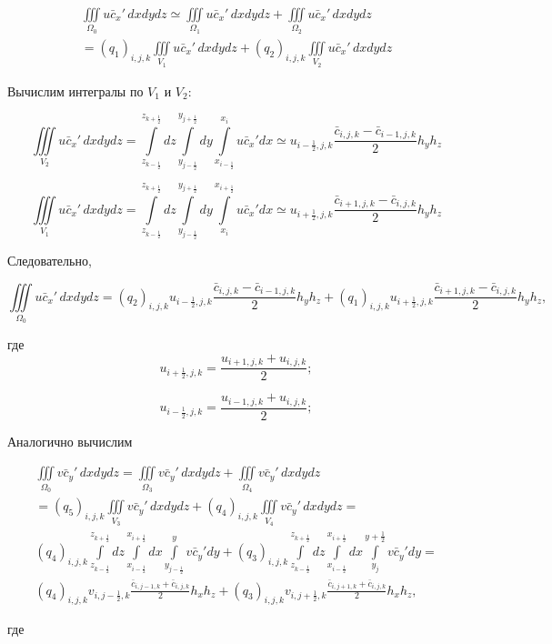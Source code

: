 \documentclass[12pt]{article}
\begin{document}
\begin{multline*}
\iiint\limits_{\Omega_0} u\bar{c}_x'\,dxdydz \simeq \iiint\limits_{\Omega_1} u\bar{c}_x'\,dxdydz + \iiint\limits_{\Omega_2} u\bar{c}_x'\,dxdydz \\  
= (q_1)_{i,j,k}\iiint\limits_{V_1} u\bar{c}_x'\,dxdydz + (q_2)_{i,j,k}\iiint\limits_{V_2} u\bar{c}_x'\,dxdydz
\end{multline*}

Вычислим интегралы по $V_1$ и $V_2$:

\begin{equation*}
	\iiint\limits_{V_2} u\bar{c}_x'\,dxdydz = \int\limits_{z_{k-\frac{1}{2}}}^{z_{k+\frac{1}{2}}}dz \int\limits_{y_{j-\frac{1}{2}}}^{y_{j+\frac{1}{2}}}dy   \int\limits_{x_{i-\frac{1}{2}}}^{x_{i}}u\bar{c}_x'dx \simeq u_{{i-\frac{1}{2}},j,k}\frac{\bar{c}_{i,j,k}-\bar{c}_{i-1,j,k}}{2}h_yh_z
\end{equation*}

\begin{equation*}
\iiint\limits_{V_1} u\bar{c}_x'\,dxdydz = \int\limits_{z_{k-\frac{1}{2}}}^{z_{k+\frac{1}{2}}}dz \int\limits_{y_{j-\frac{1}{2}}}^{y_{j+\frac{1}{2}}}dy   \int\limits_{x_i}^{x_{i+\frac{1}{2}}}u\bar{c}_x'dx \simeq u_{{i+\frac{1}{2}},j,k}\frac{\bar{c}_{i+1,j,k}-\bar{c}_{i,j,k}}{2}h_yh_z
\end{equation*}

Следовательно,

\begin{equation}
	\iiint\limits_{\Omega_0} u\bar{c}_x'\,dxdydz = (q_2)_{i,j,k}u_{{i-\frac{1}{2}},j,k}\frac{\bar{c}_{i,j,k}-\bar{c}_{i-1,j,k}}{2}h_yh_z +
	(q_1)_{i,j,k}u_{{i+\frac{1}{2}},j,k}\frac{\bar{c}_{i+1,j,k}-\bar{c}_{i,j,k}}{2}h_yh_z,
\end{equation}

где 
\begin{equation*} 
	u_{{i+\frac{1}{2}},j,k} = \frac{u_{i+1,j,k}+u_{i,j,k}}{2};
\end{equation*}

\begin{equation*} 
	u_{{i-\frac{1}{2}},j,k} = \frac{u_{i-1,j,k}+u_{i,j,k}}{2};
\end{equation*}

Аналогично вычислим

\begin{multline*}
	\iiint\limits_{\Omega_0} v\bar{c}_y'\,dxdydz = 
	\iiint\limits_{\Omega_3} v\bar{c}_y'\,dxdydz + 
	\iiint\limits_{\Omega_4} v\bar{c}_y'\,dxdydz \\  
	= (q_5)_{i,j,k}\iiint\limits_{V_3} v\bar{c}_y'\,dxdydz +
	 (q_4)_{i,j,k}\iiint\limits_{V_4} v\bar{c}_y'\,dxdydz = \\
	 (q_4)_{i,j,k}\int\limits_{z_{k-\frac{1}{2}}}^{z_{k+\frac{1}{2}}}dz\int\limits_{x_{i-\frac{1}{2}}}^{x_{i+\frac{1}{2}}}dx\int\limits_{y_{j-\frac{1}{2}}}^yv\bar{c}_y'dy + (q_3)_{i,j,k}\int\limits_{z_{k-\frac{1}{2}}}^{z_{k+\frac{1}{2}}}dz\int\limits_{x_{i-\frac{1}{2}}}^{x_{i+\frac{1}{2}}}dx\int\limits_{y_j}^{y+\frac{1}{2}}v\bar{c}_y'dy = \\
	 (q_4)_{i,j,k}v_{i,j-\frac{1}{2},k}\frac{\bar{c}_{i,j-1,k}+\bar{c}_{i,j,k}}{2}h_xh_z + (q_3)_{i,j,k}v_{i,j+\frac{1}{2},k}\frac{\bar{c}_{i,j+1,k}+\bar{c}_{i,j,k}}{2}h_xh_z,
\end{multline*}

где 
\end{document}
